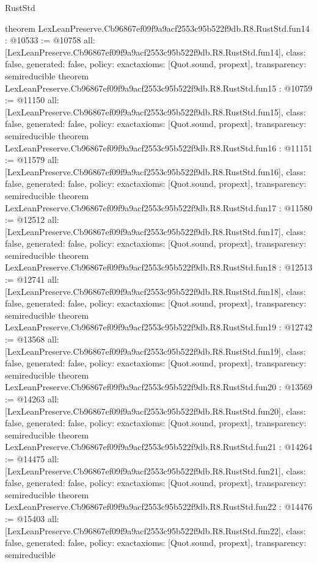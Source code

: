 \begin{lexlean}{RustStd}
\begin{coremodule}
{}
theorem LexLeanPreserve.Cb96867ef09f9a9acf2553c95b522f9db.R8.RustStd.fun14 : @10533 := @10758 {
  all: [LexLeanPreserve.Cb96867ef09f9a9acf2553c95b522f9db.R8.RustStd.fun14],
  class: false,
  generated: false,
  policy: exact{axioms: [Quot.sound, propext]},
  transparency: semireducible
}
theorem LexLeanPreserve.Cb96867ef09f9a9acf2553c95b522f9db.R8.RustStd.fun15 : @10759 := @11150 {
  all: [LexLeanPreserve.Cb96867ef09f9a9acf2553c95b522f9db.R8.RustStd.fun15],
  class: false,
  generated: false,
  policy: exact{axioms: [Quot.sound, propext]},
  transparency: semireducible
}
theorem LexLeanPreserve.Cb96867ef09f9a9acf2553c95b522f9db.R8.RustStd.fun16 : @11151 := @11579 {
  all: [LexLeanPreserve.Cb96867ef09f9a9acf2553c95b522f9db.R8.RustStd.fun16],
  class: false,
  generated: false,
  policy: exact{axioms: [Quot.sound, propext]},
  transparency: semireducible
}
theorem LexLeanPreserve.Cb96867ef09f9a9acf2553c95b522f9db.R8.RustStd.fun17 : @11580 := @12512 {
  all: [LexLeanPreserve.Cb96867ef09f9a9acf2553c95b522f9db.R8.RustStd.fun17],
  class: false,
  generated: false,
  policy: exact{axioms: [Quot.sound, propext]},
  transparency: semireducible
}
theorem LexLeanPreserve.Cb96867ef09f9a9acf2553c95b522f9db.R8.RustStd.fun18 : @12513 := @12741 {
  all: [LexLeanPreserve.Cb96867ef09f9a9acf2553c95b522f9db.R8.RustStd.fun18],
  class: false,
  generated: false,
  policy: exact{axioms: [Quot.sound, propext]},
  transparency: semireducible
}
theorem LexLeanPreserve.Cb96867ef09f9a9acf2553c95b522f9db.R8.RustStd.fun19 : @12742 := @13568 {
  all: [LexLeanPreserve.Cb96867ef09f9a9acf2553c95b522f9db.R8.RustStd.fun19],
  class: false,
  generated: false,
  policy: exact{axioms: [Quot.sound, propext]},
  transparency: semireducible
}
theorem LexLeanPreserve.Cb96867ef09f9a9acf2553c95b522f9db.R8.RustStd.fun20 : @13569 := @14263 {
  all: [LexLeanPreserve.Cb96867ef09f9a9acf2553c95b522f9db.R8.RustStd.fun20],
  class: false,
  generated: false,
  policy: exact{axioms: [Quot.sound, propext]},
  transparency: semireducible
}
theorem LexLeanPreserve.Cb96867ef09f9a9acf2553c95b522f9db.R8.RustStd.fun21 : @14264 := @14475 {
  all: [LexLeanPreserve.Cb96867ef09f9a9acf2553c95b522f9db.R8.RustStd.fun21],
  class: false,
  generated: false,
  policy: exact{axioms: [Quot.sound, propext]},
  transparency: semireducible
}
theorem LexLeanPreserve.Cb96867ef09f9a9acf2553c95b522f9db.R8.RustStd.fun22 : @14476 := @15403 {
  all: [LexLeanPreserve.Cb96867ef09f9a9acf2553c95b522f9db.R8.RustStd.fun22],
  class: false,
  generated: false,
  policy: exact{axioms: [Quot.sound, propext]},
  transparency: semireducible
}
\end{coremodule}
\end{lexlean}
